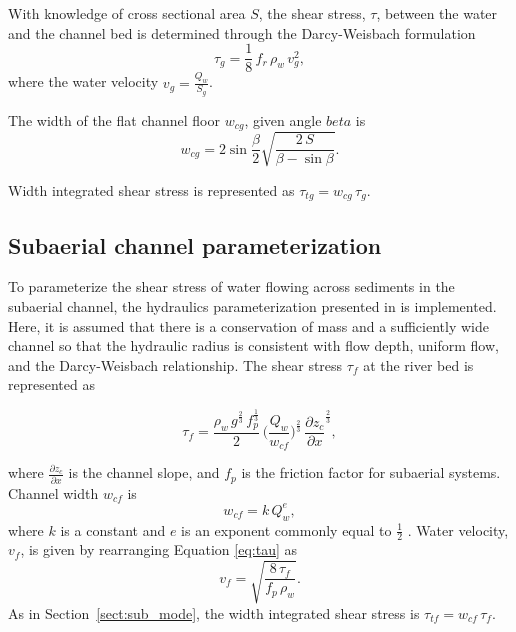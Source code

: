 \documentclass[draft]{agujournal2019}
\begin{document}
With knowledge of cross sectional area $S$, the shear stress, $\tau$, between the water and the channel bed is determined through the Darcy-Weisbach formulation
\begin{equation}
  \label{eq:tau}
  \tau_g=\frac{1}{8}\,f_r\,\rho_w\,v_g^2,
\end{equation}
% 
where  the water velocity $v_g = \frac{Q_w}{S_g}$.

The width of the flat channel floor $w_{cg}$, given angle $beta$ is 
\begin{equation}
  \label{eq:dh2wc}
  w_{cg} = 2  \sin \frac{\beta}{2} \sqrt{\frac{2\, S}{\beta -\sin \beta}}.
\end{equation}

Width integrated shear stress is represented as $\tau_{tg}=w_{cg}\,\tau_g $.

\subsection{Subaerial channel  parameterization}
\label{sect:fluv}

To parameterize the shear stress of water flowing across sediments in the subaerial channel,  the hydraulics parameterization presented in  is implemented.
Here, it is assumed that there is a conservation of mass and a sufficiently wide channel so that the hydraulic radius is consistent with flow depth, uniform flow, and the Darcy-Weisbach relationship.
The shear stress $\tau_f$ at the river bed is represented as
\begin{linenomath*}
  \begin{equation}
    \label{eq:DW_tau}
    \tau_f=\frac{\rho_w\,g^{\frac{2}{3}}\,f_p^{\frac{1}{3}}}{2}\, \Big(\frac{Q_w}{w_{cf}} \Big)^{\frac{2}{3}} \,\frac{\partial z_c}{\partial x}^{\frac{2}{3}},
  \end{equation}
\end{linenomath*}
where $\frac{\partial z_c}{\partial x}$ is the channel slope, and $f_p$ is the friction factor for subaerial systems.
Channel width $w_{cf}$ is 
\begin{equation}
  \label{eq:wcf}
  w_{cf} = k \, Q_w^e,
\end{equation}
% 
where $k$ is a constant and $e$ is an exponent commonly equal to $\frac{1}{2}$ \cite{leopold1953}.
Water velocity, $v_f$, is given by rearranging Equation \ref{eq:tau} as
\begin{equation}
  \label{eq:vf}
  v_f = \sqrt{\frac{8\,\tau_f}{f_p\,\rho_w}}.
\end{equation}
% 
As in Section~\ref{sect:sub_mode}, the width integrated shear stress is $\tau_{tf}=w_{cf}\,\tau_f$.
\end{document}
